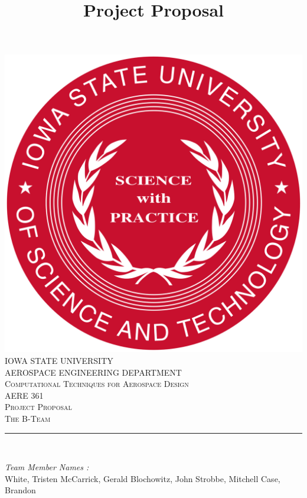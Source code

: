 \documentclass[12pt]{article}
\begin{document}
\title{Project Proposal}

\begin{titlepage}
	\centering
    \vspace*{0.5 cm}
    \includegraphics[scale = 0.11]{isu_seal.png}\\[1.0 cm]	%
    \textsc{\LARGE IOWA STATE UNIVERSITY}\\[2.0 cm]
    \textsc{\large AEROSPACE ENGINEERING DEPARTMENT}\\[0.2 cm]
    \textsc{\large Computational Techniques for Aerospace Design}\\[0.2 cm]
	\textsc{\Large AERE 361}\\[0.5 cm]				%
	\textsc{\Large Project Proposal}\\[0.2 cm]
	\textsc{\Large The B-Team}\\[0.2 cm]
	\rule{\linewidth}{0.2 mm} \\[0.4 cm]
	
	
	\begin{minipage}{0.8\textwidth}
		
			\begin{flushleft} 
			\emph{Team Member Names :} \\
			White, Tristen\linebreak
			McCarrick, Gerald\linebreak
			Blochowitz, John\linebreak
			Strobbe, Mitchell\linebreak
			Case, Brandon\linebreak
			
		\end{flushleft}
	\end{minipage}\\[2 cm]
	
	\vfill
	
\end{titlepage}
\end{document}
